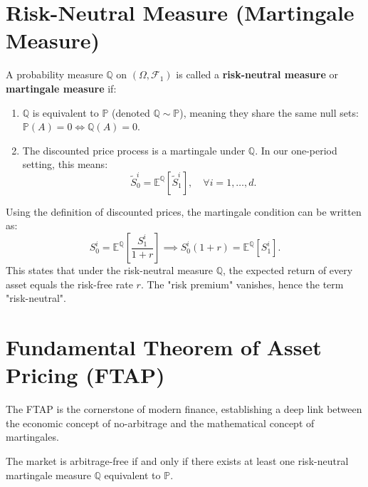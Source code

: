 \section{Risk-Neutral Measure (Martingale Measure)}

\begin{definition}
A probability measure $\mathbb{Q}$ on $(\Omega, \mathcal{F}_1)$ is called a \textbf{risk-neutral measure} or \textbf{martingale measure} if:
\begin{enumerate}
    \item $\mathbb{Q}$ is equivalent to $\mathbb{P}$ (denoted $\mathbb{Q} \sim \mathbb{P}$), meaning they share the same null sets: $\mathbb{P}(A) = 0 \iff \mathbb{Q}(A) = 0$.
    \item The discounted price process is a martingale under $\mathbb{Q}$. In our one-period setting, this means:
    \begin{equation}
        \tilde{S}_0^i = \mathbb{E}^\mathbb{Q}[\tilde{S}_1^i], \quad \forall i = 1, \dots, d.
    \end{equation}
\end{enumerate}
\end{definition}

Using the definition of discounted prices, the martingale condition can be written as:
\begin{equation}
    S_0^i = \mathbb{E}^\mathbb{Q} \left[ \frac{S_1^i}{1+r} \right] \implies S_0^i(1+r) = \mathbb{E}^\mathbb{Q}[S_1^i].
\end{equation}
This states that under the risk-neutral measure $\mathbb{Q}$, the expected return of every asset equals the risk-free rate $r$. The "risk premium" vanishes, hence the term "risk-neutral".

\section{Fundamental Theorem of Asset Pricing (FTAP)}

The FTAP is the cornerstone of modern finance, establishing a deep link between the economic concept of no-arbitrage and the mathematical concept of martingales.

\begin{theorem}
The market is arbitrage-free if and only if there exists at least one risk-neutral martingale measure $\mathbb{Q}$ equivalent to $\mathbb{P}$.
\end{theorem}

